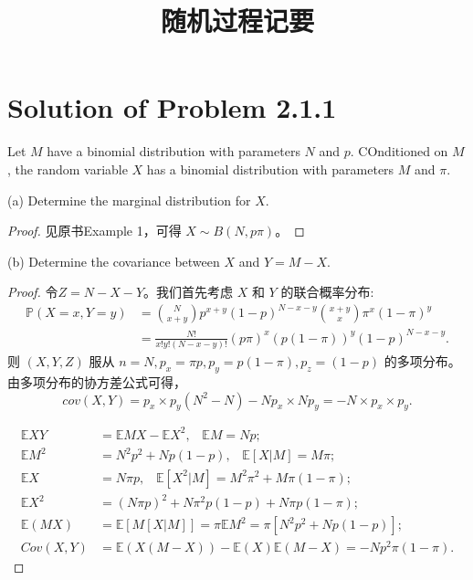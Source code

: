\documentclass[reqno,a4paper,14pt]{amsart}
\title{随机过程记要}
\newcommand\mE{\mathbb{E}}
\newcommand\Pro{\mathbb{P}}
\begin{document}
\maketitle


\section{Solution of Problem 2.1.1}
Let $M$ have a binomial distribution with parameters $N$ and $p$. COnditioned on $M$, the random variable $X$ has a binomial distribution with parameters $M$ and $\pi$.

(a) Determine the marginal distribution for $X$.
\begin{proof}
    见原书Example 1，可得 $X\sim B(N, p\pi)$。
\end{proof}
(b) Determine the covariance between $X$ and $Y=M-X$.
\begin{proof}
    令$Z=N-X-Y$。我们首先考虑 $X$ 和 $Y$ 的联合概率分布:
    \begin{equation}
        \begin{split}
            \Pro(X=x,Y=y)&=\binom{N}{x+y} p^{x+y} (1-p)^{N-x-y} \binom{x+y}{x} \pi^x (1-\pi)^y\\
            &=\frac{N!}{x!y!(N-x-y)!} (p\pi)^x (p(1-\pi))^y (1-p)^{N-x-y}.
            \label{mass}
        \end{split}
    \end{equation}
    则 $(X,Y,Z)$ 服从 $n=N,p_x=\pi p,p_y=p(1-\pi),p_z=(1-p)$ 的多项分布。由多项分布的协方差公式可得，
    \begin{equation*}
        cov(X,Y)=p_x\times p_y(N^2-N)-Np_x\times Np_y=-N\times p_x\times p_y.
    \end{equation*}

    \begin{align*}
        \mE XY &=\mE MX-\mE X^2,\;\;\; \mE M=Np;\\
        \mE M^2 &= N^2p^2+Np(1-p),\;\;\; \mE [X|M]=M\pi;\\
        \mE X&=N\pi p,\;\;\; \mE [X^2|M]=M^2\pi^2+ M\pi(1-\pi);\\
        \mE X^2&=(N\pi p)^2+N\pi^2p(1-p)+N\pi p(1-\pi);\\
        \mE (MX)&=\mE [M[X|M]]=\pi\mE M^2=\pi [N^2p^2+Np(1-p)];\\
        Cov(X,Y)&= \mE (X(M-X))-\mE (X)\mE (M-X)=-Np^2\pi(1-\pi).
    \end{align*}
\end{proof}
\end{document}
